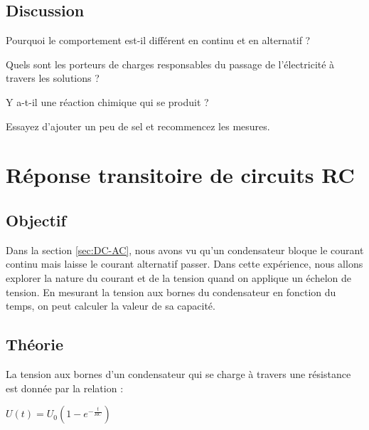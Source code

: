 \documentclass{book}
\begin{document}
\subsection{Discussion}


Pourquoi le comportement est-il différent en continu et en alternatif ?



Quels sont les porteurs de charges responsables du passage de l'électricité à travers les solutions ?



Y a-t-il une réaction chimique qui se produit ?



Essayez d'ajouter un peu de sel et recommencez les mesures.










\section{Réponse transitoire de circuits RC}


 \label{sec:Capacitor-charging}

\subsection{Objectif}


Dans la section  \ref{sec:DC-AC}, nous avons vu qu'un condensateur bloque le courant continu mais laisse le courant alternatif passer. Dans cette expérience, nous allons explorer la nature du courant et de la tension quand on applique un échelon de tension. En mesurant la tension aux bornes du condensateur en fonction du temps, on peut calculer la valeur de sa capacité.

\subsection{Théorie}


La tension aux bornes d'un condensateur qui se charge à travers une résistance est donnée par la relation :



$U(t)=U_{0}\left(1-e^{-\frac{t}{RC} }\right)$
\end{document}
